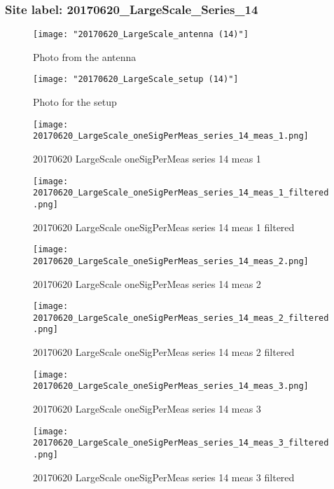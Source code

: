 \subsubsection{Site label: 20170620\_LargeScale\_Series\_14}
\begin{figure}[ht] \caption{Photo from the antenna}
\texttt{[image: "20170620\_LargeScale\_antenna (14)"]}\centering\end{figure}
\begin{figure}[ht] \caption{Photo for the setup}
\texttt{[image: "20170620\_LargeScale\_setup (14)"]}\centering\end{figure}
\begin{figure}[ht] \caption{20170620 LargeScale oneSigPerMeas series 14 meas 1}
\texttt{[image: 20170620\_LargeScale\_oneSigPerMeas\_series\_14\_meas\_1.png]}\centering\end{figure}
\begin{figure}[ht] \caption{20170620 LargeScale oneSigPerMeas series 14 meas 1 filtered}
\texttt{[image: 20170620\_LargeScale\_oneSigPerMeas\_series\_14\_meas\_1\_filtered.png]}\centering\end{figure}
\begin{figure}[ht] \caption{20170620 LargeScale oneSigPerMeas series 14 meas 2}
\texttt{[image: 20170620\_LargeScale\_oneSigPerMeas\_series\_14\_meas\_2.png]}\centering\end{figure}
\begin{figure}[ht] \caption{20170620 LargeScale oneSigPerMeas series 14 meas 2 filtered}
\texttt{[image: 20170620\_LargeScale\_oneSigPerMeas\_series\_14\_meas\_2\_filtered.png]}\centering\end{figure}
\begin{figure}[ht] \caption{20170620 LargeScale oneSigPerMeas series 14 meas 3}
\texttt{[image: 20170620\_LargeScale\_oneSigPerMeas\_series\_14\_meas\_3.png]}\centering\end{figure}
\begin{figure}[ht] \caption{20170620 LargeScale oneSigPerMeas series 14 meas 3 filtered}
\texttt{[image: 20170620\_LargeScale\_oneSigPerMeas\_series\_14\_meas\_3\_filtered.png]}\centering\end{figure}
\clearpage
